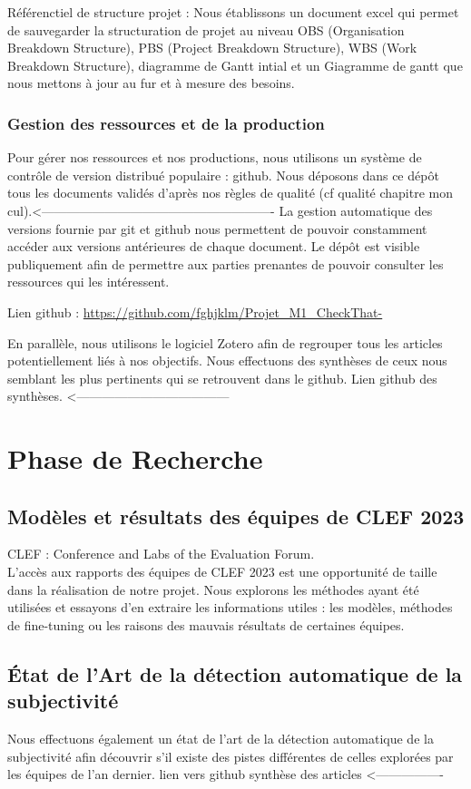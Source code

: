 \documentclass[11pt]{rapport_class}
\begin{document}
Référenctiel de structure projet : Nous établissons un document excel qui permet de sauvegarder la structuration de projet au niveau OBS (Organisation Breakdown Structure), PBS (Project Breakdown Structure), WBS (Work Breakdown Structure), diagramme de Gantt intial et un Giagramme de gantt que nous mettons à jour au fur et à mesure des besoins.

\subsection{Gestion des ressources et de la production}
\qquad Pour gérer nos ressources et nos productions, nous utilisons un système de contrôle de version distribué populaire : github. Nous déposons dans ce dépôt tous les documents validés d'après nos règles de qualité (cf qualité chapitre mon cul).<------------------------------------------------------- La gestion automatique des versions fournie par git et github nous permettent de pouvoir constamment accéder aux versions antérieures de chaque document. Le dépôt est visible publiquement afin de permettre aux parties prenantes de pouvoir consulter les ressources qui les intéressent.

Lien github : \url{https://github.com/fghjklm/Projet_M1_CheckThat-}

En parallèle, nous utilisons le logiciel Zotero afin de regrouper tous les articles potentiellement liés à nos objectifs. Nous effectuons des synthèses de ceux nous semblant les plus pertinents qui se retrouvent dans le github.
Lien github des synthèses. <------------------------------------

\chapter{Phase de Recherche}
\section{Modèles et résultats des équipes de CLEF 2023}
CLEF : Conference and Labs of the Evaluation Forum.\\
\vspace{0mm}
\qquad L'accès aux rapports des équipes de CLEF 2023 est une opportunité de taille dans la réalisation de notre projet. Nous explorons les méthodes ayant été utilisées et essayons d'en extraire les informations utiles : les modèles, méthodes de fine-tuning ou les raisons des mauvais résultats de certaines équipes.

\section{État de l'Art de la détection automatique de la subjectivité}
\qquad Nous effectuons également un état de l'art de la détection automatique de la subjectivité afin découvrir s'il existe des pistes différentes de celles explorées par les équipes de l'an dernier.
lien vers github synthèse des articles <----------------
\end{document}
